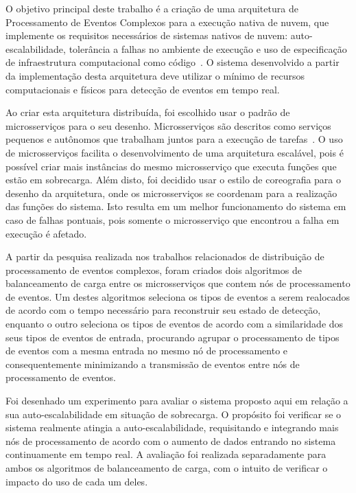 O objetivo principal deste trabalho é a criação de uma arquitetura de Processamento de Eventos Complexos para a execução nativa de nuvem, que implemente os requisitos necessários de sistemas nativos de nuvem: auto-escalabilidade, tolerância a falhas no ambiente de execução e uso de especificação de infraestrutura computacional como código~\citep{garrison2017cloud}. O sistema desenvolvido a partir da implementação desta arquitetura deve utilizar o mínimo de recursos computacionais e físicos para detecção de eventos em tempo real.

Ao criar esta arquitetura distribuída, foi escolhido usar o padrão de microsserviços para o seu desenho. Microsserviços são descritos como serviços pequenos e autônomos que trabalham juntos para a execução de tarefas~\citep{Newman:2015:BM:2904388}. O uso de microsserviços facilita o desenvolvimento de uma arquitetura escalável, pois é possível criar mais instâncias do mesmo microsserviço que executa funções que estão em sobrecarga. Além disto, foi decidido usar o estilo de coreografia para o desenho da arquitetura, onde os microsserviços se coordenam para a realização das funções do sistema. Isto resulta em um melhor funcionamento do sistema em caso de falhas pontuais, pois somente o microsserviço que encontrou a falha em execução é afetado.

A partir da pesquisa realizada nos trabalhos relacionados de distribuição de processamento de eventos complexos, foram  criados dois algoritmos de balanceamento de carga entre os microsserviços que contem nós de processamento de eventos. Um destes algoritmos seleciona os tipos de eventos a serem realocados de acordo com o tempo necessário para reconstruir seu estado de detecção, enquanto o outro seleciona os tipos de eventos de acordo com a similaridade dos seus tipos de eventos de entrada, procurando agrupar o processamento de tipos de eventos com a mesma entrada no mesmo nó de processamento e consequentemente minimizando a transmissão de eventos entre nós de processamento de eventos.

Foi desenhado um experimento para avaliar o sistema proposto aqui em relação a sua auto-escalabilidade em situação de sobrecarga. O propósito foi verificar se o sistema realmente atingia a auto-escalabilidade, requisitando e integrando mais nós de processamento de acordo com o aumento de dados entrando no sistema continuamente em tempo real. A avaliação foi realizada separadamente para ambos os algoritmos de balanceamento de carga, com o intuito de verificar o impacto do uso de cada um deles.

